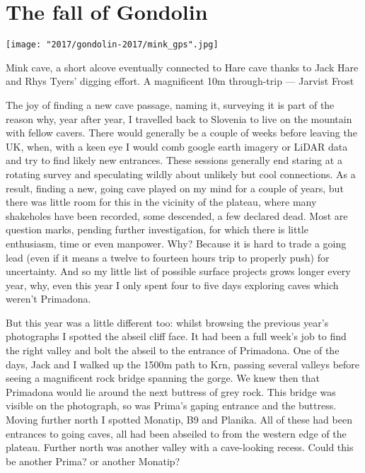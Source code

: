 \section{The fall of Gondolin}

\begin{marginfigure}
\checkoddpage \ifoddpage \forcerectofloat \else \forceversofloat \fi
\centering
 \texttt{[image: "2017/gondolin-2017/mink\_gps".jpg]} 
 \caption{Mink cave, a short alcove eventually connected to Hare cave thanks to Jack Hare and Rhys Tyers' digging effort. A magnificent 10m through-trip --- Jarvist Frost}
 \label{Sunset}
\end{marginfigure}

The joy of finding a new cave passage, naming it, surveying it is part of the reason why, year after year, I travelled back to Slovenia to live on the mountain with fellow cavers. There would generally be a couple of weeks before leaving the UK, when, with a keen eye I would comb google earth imagery or LiDAR data and try to find likely new entrances. These sessions generally end staring at a rotating survey and speculating wildly about unlikely but cool connections. As a result, finding a new, going cave played on my mind for a couple of years, but there was little room for this in the vicinity of the plateau, where many shakeholes have been recorded, some descended, a few declared dead. Most are question marks, pending further investigation, for which there is little enthusiasm, time or even manpower. Why? Because it is hard to trade a going lead (even if it means a twelve to fourteen hours trip to properly push) for uncertainty. And so my little list of possible surface projects grows longer every year, why, even this year I only spent four to five days exploring caves which weren’t Primadona.

But this year was a little different too: whilst browsing the previous year’s photographs I spotted the abseil cliff face. It had been a full week’s job to find the right valley and bolt the abseil to the entrance of Primadona. One of the days, Jack and I walked up the 1500m path to Krn, passing several valleys before seeing a magnificent rock bridge spanning the gorge. We knew then that Primadona would lie around the next buttress of grey rock. This bridge was visible on the photograph, so was Prima’s gaping entrance and the buttress. Moving further north I spotted Monatip, B9 and Planika. All of these had been entrances to going caves, all had been abseiled to from the western edge of the plateau. Further north was another valley with a cave-looking recess. Could this be another Prima? or another Monatip?

